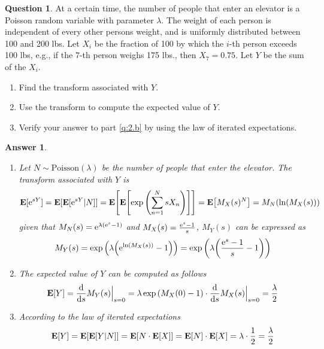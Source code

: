 \documentclass[utf8]{article}
\theoremstyle{definition}%
\newtheorem{question}{Question} %
\theoremstyle{plain}%
\newtheorem{answer}{Answer} %
\begin{document}
\begin{question}
At a certain time, the number of people that enter an elevator is a Poisson random variable with parameter $\lambda$. The weight of each person is independent of every other persons weight, and is uniformly distributed between 100 and 200 lbs. Let $X_i$ be the fraction of 100 by which the $i$-th person exceeds 100 lbs, e.g., if the 7-th person weighs 175 lbs., then $X_7 = 0.75$. Let $Y$ be the sum of the $X_i$.
\begin{enumerate}[label=(\alph*)]
    \item Find the transform associated with $Y$.
    \item \label{q:2.b} Use the transform to compute the expected value of $Y$. 
    \item Verify your answer to part \ref{q:2.b} by using the law of iterated expectations.
\end{enumerate}
\end{question}
\begin{answer} ~
    \begin{enumerate}[label=(\alph*)]
        \item Let $N \sim \text{Poisson}(\lambda)$ be the number of people that enter the elevator. The transform associated with $Y$ is
        \begin{equation}
            \mathbf{E}[\mathrm{e}^{sY}] = \mathbf{E}[\mathbf{E}[\mathrm{e}^{sY} | N]] = \mathbf{E}\qty[\mathbf{E}\qty[\exp\qty(\sum_{n=1}^{N}sX_n)]] = \mathbf{E}\qty[M_{X}(s)^N] = M_N(\ln(M_X(s))) 
        \end{equation}
        given that $M_N(s) = \mathrm{e}^{\lambda(\mathrm{e}^s - 1)}$ and $M_X(s) = \frac{\mathrm{e}^s - 1}{s}$, $M_Y(s)$ can be expressed as
        \begin{equation}
            M_Y(s) = \exp\qty(\lambda\qty(\mathrm{e}^{\ln(M_X(s))} - 1)) = \exp\qty(\lambda\qty(\frac{\mathrm{e}^s - 1}{s} - 1))
        \end{equation}
        \item The expected value of $Y$ can be computed as follows
        \begin{equation}
            \mathbf{E}[Y] = \dv{s} M_Y(s) \Big|_{s=0} = \lambda \exp\qty(M_X(0) - 1) \cdot \dv{s} M_X(s) \Big|_{s=0} = \frac{\lambda}{2}
        \end{equation}
        \item According to the law of iterated expectations
        \begin{equation}
            \mathbf{E}[Y] = \mathbf{E}[\mathbf{E}[Y | N]] = \mathbf{E}[N \cdot \mathbf{E}[X]] = \mathbf{E}[N] \cdot \mathbf{E}[X] = \lambda \cdot \frac{1}{2} = \frac{\lambda}{2}
        \end{equation}
    \end{enumerate}
\end{answer}
\end{document}
